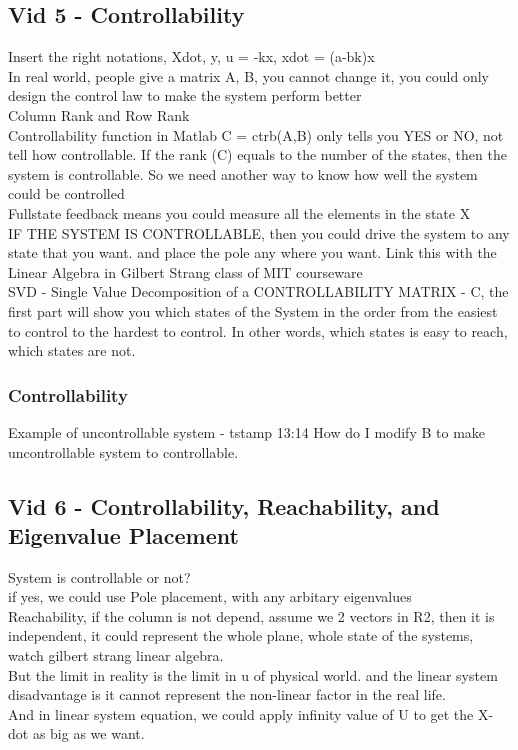 \subsection{Vid 5 - Controllability}
Insert the right notations, Xdot, y, u = -kx, xdot = (a-bk)x
\\In real world, people give a matrix A, B, you cannot change it, you could only design the control law to make the system perform better
\\Column Rank and Row Rank
\\Controllability function in Matlab C = ctrb(A,B) only tells you YES or NO, not tell how controllable.
If the rank (C) equals to the number of the states, then the system is controllable.
So we need another way to know how well the system could be controlled
\\Fullstate feedback means you could measure all the elements in the state X
\\IF THE SYSTEM IS CONTROLLABLE, then you could drive the system to any state that you want. and place the pole any where you want.
Link this with the Linear Algebra in Gilbert Strang class of MIT courseware
\\SVD - Single Value Decomposition of a CONTROLLABILITY MATRIX - C, the first part will show you which states of the System
in the order from the easiest to control to the hardest to control.
In other words, which states is easy to reach, which states are not.



\subsubsection{Controllability}
Example of uncontrollable system - tstamp 13:14
How do I modify B to make uncontrollable system to controllable.


\subsection{Vid 6 - Controllability, Reachability, and Eigenvalue Placement }
System is controllable or not?
\\if yes, we could use Pole placement, with any arbitary eigenvalues
\\Reachability, if the column is not depend, assume we 2 vectors in R2, then it is independent,
it could represent the whole plane, whole state of the systems, watch gilbert strang linear algebra.
\\But the limit in reality is the limit in u of physical world. and the linear system disadvantage is
it cannot represent the non-linear factor in the real life.
\\And in linear system equation, we could apply infinity value of U to get the X-dot as big as we want.


